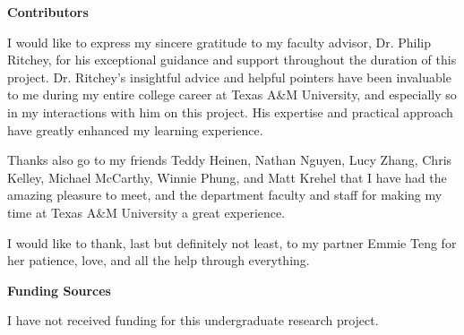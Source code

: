 
\noindent\textbf{Contributors} %

\indent\indent I would like to express my sincere gratitude to my faculty advisor, Dr. Philip Ritchey, for his exceptional guidance and support throughout the duration of this project. Dr. Ritchey's insightful advice and helpful pointers have been invaluable to me during my entire college career at Texas A\&M University, and especially so in my interactions with him on this project. His expertise and practical approach have greatly enhanced my learning experience.

\indent\indent Thanks also go to my friends Teddy Heinen, Nathan Nguyen, Lucy Zhang, Chris Kelley, Michael McCarthy, Winnie Phung, and Matt Krehel that I have had the amazing pleasure to meet, and the department faculty and staff for making my time at Texas A\&M University a great experience. 

\indent\indent I would like to thank, last but definitely not least, to my partner Emmie Teng for her patience, love, and all the help through everything.




\noindent\textbf{Funding Sources} %

\indent\indent I have not received funding for this undergraduate research project.


\pagebreak{}